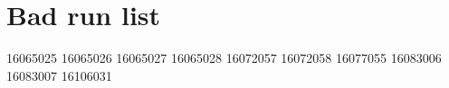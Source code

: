 

\chapter{Bad run list}\label{chap:badRunList}


16065025
16065026
16065027
16065028
16072057
16072058
16077055
16083006
16083007
16106031

